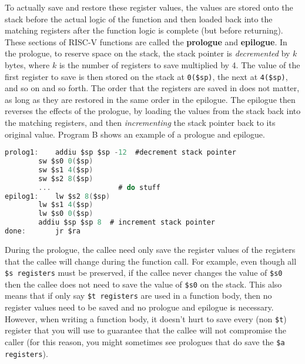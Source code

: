 \documentclass{article}
\begin{document}
To actually save and restore these register values, the values are stored onto the stack before the actual logic of the function and then loaded back into the matching registers after the function logic is complete (but before returning). These sections of RISC-V functions are called the \textbf{prologue} and \textbf{epilogue}. In the prologue, to reserve space on the stack, the stack pointer is \textit{decremented} by $k$ bytes, where $k$ is the number of registers to save multiplied by 4. The value of the first register to save is then stored on the stack at \texttt{0(\$sp)}, the next at \texttt{4(\$sp)}, and so on and so forth. The order that the registers are saved in does not matter, as long as they are restored in the same order in the epilogue. The epilogue then reverses the effects of the prologue, by loading the values from the stack back into the matching registers, and then \textit{incrementing} the stack pointer back to its original value. Program B shows an example of a prologue and epilogue.
\begin{center}
\renewcommand{\ttdefault}{pcr}
\begin{lstlisting}[language=C, basicstyle=\ttfamily, keywordstyle=\bfseries, showstringspaces=false, morekeywords={jal, addu, move, bne, j, sw, addiu, lw, jr}]
prolog1:  	addiu $sp $sp -12  #decrement stack pointer
		sw $s0 0($sp)
		sw $s1 4($sp)
		sw $s2 8($sp)
		... 			   # do stuff
epilog1:	lw $s2 8($sp)
		lw $s1 4($sp)
		lw $s0 0($sp)
		addiu $sp $sp 8  # increment stack pointer
done:		jr $ra 
\end{lstlisting}
\end{center}
During the prologue, the callee need only save the register values of the registers that the callee will change during the function call. For example, even though all \texttt{\$s registers} must be preserved, if the callee never changes the value of \texttt{\$s0} then the callee does not need to save the value of \texttt{\$s0} on the stack. This also means that if only say \texttt{\$t registers} are used in a function body, then no register values need to be saved and no prologue and epilogue is necessary. However, when writing a function body, it doesn't hurt to save every (non \texttt{\$t}) register that you will use to guarantee that the callee will not compromise the caller (for this reason, you might sometimes see prologues that do save the \texttt{\$a registers}).
\end{document}
